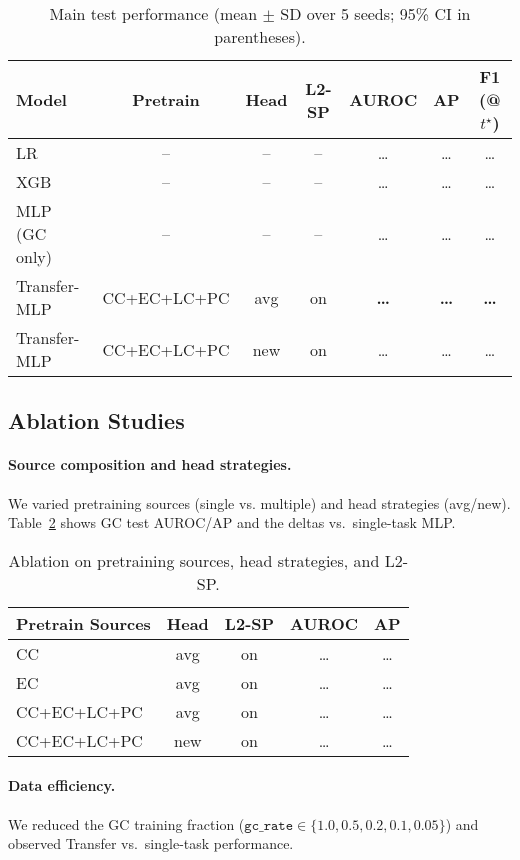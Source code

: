 \documentclass[journal,article,submit,pdftex,moreauthors]{Definitions/mdpi}
\begin{document}
\begin{table}[H]
\caption{Main test performance (mean $\pm$ SD over 5 seeds; 95\% CI in parentheses).}
\label{tab:main}
\centering
\begin{tabular}{lcccccc}
\toprule
Model & Pretrain & Head & L2-SP & AUROC & AP & F1 (@$t^\star$) \\
\midrule
LR & -- & -- & -- & \dots & \dots & \dots \\
XGB & -- & -- & -- & \dots & \dots & \dots \\
MLP (GC only) & -- & -- & -- & \dots & \dots & \dots \\
Transfer-MLP & CC+EC+LC+PC & avg & on & \textbf{\dots} & \textbf{\dots} & \textbf{\dots} \\
Transfer-MLP & CC+EC+LC+PC & new & on & \dots & \dots & \dots \\
\bottomrule
\end{tabular}
\end{table}

\subsection{Ablation Studies}
\paragraph{Source composition and head strategies.}
We varied pretraining sources (single vs. multiple) and head strategies (avg/new).
Table~\ref{tab:ablation} shows GC test AUROC/AP and the deltas vs.\ single-task MLP.

\begin{table}[H]
\caption{Ablation on pretraining sources, head strategies, and L2-SP.}
\label{tab:ablation}
\centering
\begin{tabular}{lcccc}
\toprule
Pretrain Sources & Head & L2-SP & AUROC & AP \\
\midrule
CC & avg & on & \dots & \dots \\
EC & avg & on & \dots & \dots \\
CC+EC+LC+PC & avg & on & \dots & \dots \\
CC+EC+LC+PC & new & on & \dots & \dots \\
\bottomrule
\end{tabular}
\end{table}

\paragraph{Data efficiency.}
We reduced the GC training fraction ($\texttt{gc\_rate}\in\{1.0,0.5,0.2,0.1,0.05\}$) and observed Transfer vs.\ single-task performance. %
\end{document}
